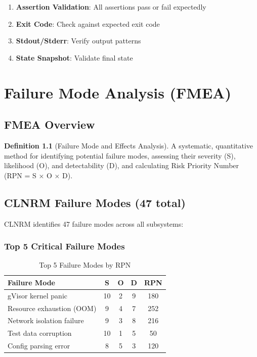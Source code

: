 \documentclass[12pt,twoside,openright]{book}
\theoremstyle{plain}
\theoremstyle{definition}
\newtheorem{definition}[theorem]{Definition}
\theoremstyle{remark}
\begin{document}
\begin{enumerate}
  \item \textbf{Assertion Validation}: All assertions pass or fail expectedly
  \item \textbf{Exit Code}: Check against expected exit code
  \item \textbf{Stdout/Stderr}: Verify output patterns
  \item \textbf{State Snapshot}: Validate final state
\end{enumerate}

\chapter{Failure Mode Analysis (FMEA)}

\section{FMEA Overview}

\begin{definition}[Failure Mode and Effects Analysis]
A systematic, quantitative method for identifying potential failure modes, assessing their severity (S), likelihood (O), and detectability (D), and calculating Risk Priority Number (RPN = S × O × D).
\end{definition}

\section{CLNRM Failure Modes (47 total)}

CLNRM identifies 47 failure modes across all subsystems:

\subsection{Top 5 Critical Failure Modes}

\begin{table}[H]
\centering
\begin{tabular}{|l|c|c|c|c|}
\hline
\textbf{Failure Mode} & \textbf{S} & \textbf{O} & \textbf{D} & \textbf{RPN} \\
\hline
gVisor kernel panic & 10 & 2 & 9 & 180 \\
\hline
Resource exhaustion (OOM) & 9 & 4 & 7 & 252 \\
\hline
Network isolation failure & 9 & 3 & 8 & 216 \\
\hline
Test data corruption & 10 & 1 & 5 & 50 \\
\hline
Config parsing error & 8 & 5 & 3 & 120 \\
\hline
\end{tabular}
\caption{Top 5 Failure Modes by RPN}
\label{tab:failure_modes}
\end{table}
\end{document}
